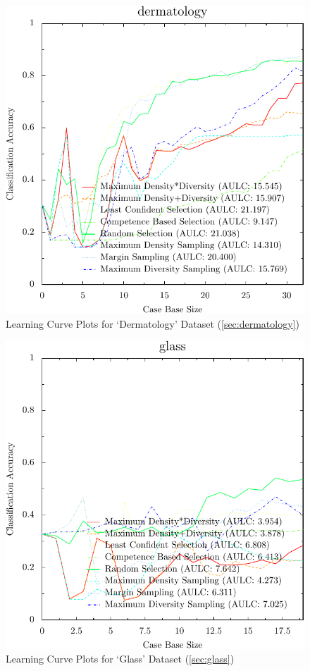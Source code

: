 \documentclass[a4paper,11pt]{report}
\begin{document}
\begin{figure}[h!]
\includegraphics{./Plots/dermatology}
\caption{Learning Curve Plots for `Dermatology' Dataset (\ref{sec:dermatology})}
\end{figure}

\begin{figure}[h!]
\includegraphics{./Plots/glass}
\caption{Learning Curve Plots for `Glass' Dataset (\ref{sec:glass})}
\end{figure}
\end{document}
